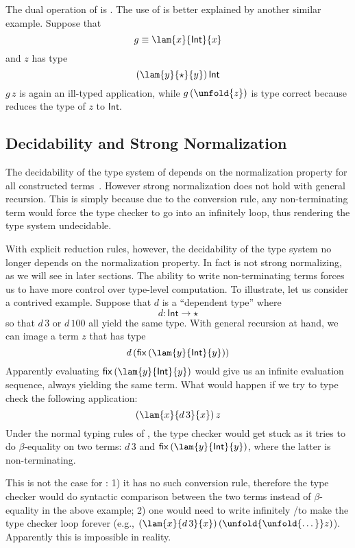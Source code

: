 The dual operation of \castup is \castdn. The use of \castdn is better explained by another similar example. Suppose that \[ g \equiv \lam{x}{\mathsf{Int}}{x} \] and $z$ has type \[ (\lam{y}{\star}{y})\,\mathsf{Int} \] $ g\,z $ is again an ill-typed application, while $ g\,(\unfold{z}) $ is type correct because \castdn reduces the type of $ z $ to $ \mathsf{Int} $.

\subsection{Decidability and Strong Normalization}


The decidability of the type system of \coc depends on the normalization property for all constructed terms~\cite{coc:decidability}. However strong normalization does not hold with general recursion. This is simply because due to the conversion rule, any non-terminating term would force the type checker to go into an infinitely loop, thus rendering the type system undecidable.

With explicit reduction rules, however, the decidability of the type system no longer depends on the normalization property. In fact \name is not strong normalizing, as we will see in later sections. The ability to write non-terminating terms forces us to have more control over type-level computation. To illustrate, let us consider a contrived example. Suppose that $d$ is a ``dependent type'' where \[d : \mathsf{Int} \rightarrow \star\] so that $d\,3$ or $d\,100$ all yield the same type.  With general recursion at hand, we can image  a term $z$ that has type \[d\,(\mathsf{fix}\,(\lam{y}{\mathsf{Int}}{y}))\] Apparently evaluating $\mathsf{fix}\,(\lam{y}{\mathsf{Int}}{y})$ would give us an infinite evaluation sequence, always yielding the same term. What would happen if we try to type check the following application: \[(\lam{x}{d\,3}{x})\,z\] Under the normal typing rules of \coc, the type checker would get stuck as it tries to do $\beta$-equality on two terms: $d\,3$ and $\mathsf{fix}\,(\lam{y}{\mathsf{Int}}{y})$, where the latter is non-terminating.

This is not the case for \name: 1) it has no such conversion rule, therefore the type checker would do syntactic comparison between the two terms instead of $\beta$-equality in the above example; 2) one would need to write infinitely \castup/\castdn to make the type checker loop forever (e.g., $(\lam{x}{d\,3}{x})\,(\unfold{\unfold{\dots}}z) $). Apparently this is impossible in reality.

